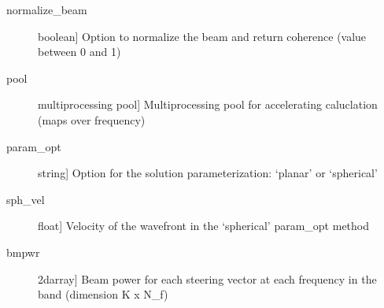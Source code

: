 \documentclass[letterpaper,10pt,english]{sphinxmanual}
\begin{document}
\begin{fulllineitems}
\begin{description}
\item[{normalize\_beam}] \leavevmode{[}boolean{]}
Option to normalize the beam and return coherence (value between 0 and 1)

\item[{pool}] \leavevmode{[}multiprocessing pool{]}
Multiprocessing pool for accelerating caluclation (maps over frequency)

\item[{param\_opt}] \leavevmode{[}string{]}
Option for the solution parameterization: ‘planar’ or ‘spherical’

\item[{sph\_vel}] \leavevmode{[}float{]}
Velocity of the wavefront in the ‘spherical’ param\_opt method

\end{description}
\begin{description}
\item[{bmpwr}] \leavevmode{[}2darray{]}
Beam power for each steering vector at each frequency in the band (dimension K x N\_f)

\end{description}

\end{fulllineitems}

\end{document}
